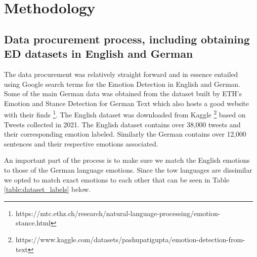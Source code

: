 \documentclass[11pt]{article}
\begin{document}
\section{Methodology}

\subsection{Data procurement process, including obtaining ED datasets in English and German}
The data procurement was relatively straight forward and in essence entailed using Google search terms for the Emotion Detection in English and German. Some of the main German data was obtained from the dataset built by ETH's Emotion and Stance Detection for German Text \cite{mascarell-etal-2021-stance} which also hosts a good website with their finds \footnote{https://mtc.ethz.ch/research/natural-language-processing/emotion-stance.html}. The English dataset was downloaded from Kaggle \footnote{https://www.kaggle.com/datasets/pashupatigupta/emotion-detection-from-text} based on Tweets collected in 2021. The English dataset contains over 38,000 tweets and their corresponding emotion labeled. Similarly the German contains over 12,000 sentences and their respective emotions associated.

An important part of the process is to make sure we match the English emotions to those of the German language emotions. Since the tow languages are dissimilar we opted to match exact emotions to each other that can be seen in Table \ref{table:dataset_labels} below.
\end{document}
